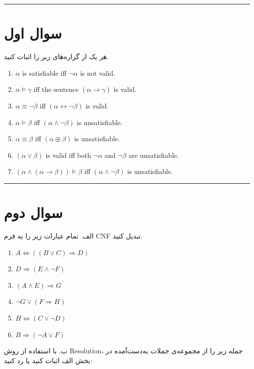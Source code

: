 \documentclass[a4paper,10pt]{article}
\begin{document}
\vspace{8pt}
\textcolor{AccentCyan}{\rule{\linewidth}{0.8pt}}
\section{\textcolor{AccentGold}{سوال اول}}
\noindent هر یک از گزاره‌های زیر را اثبات کنید.

\begin{latin}
\begin{enumerate}
	\item $\alpha$ is satisfiable iff $\neg\alpha$ is not valid.
	\item $\alpha \models \gamma$ iff the sentence $(\alpha \rightarrow \gamma)$ is valid.
	\item $\alpha \equiv \neg\beta$ iff $(\alpha \leftrightarrow \neg\beta)$ is valid.
	\item $\alpha \models \beta$ iff $(\alpha \wedge \neg\beta)$ is unsatisfiable.
	\item $\alpha \equiv \beta$ iff $(\alpha \oplus \beta)$ is unsatisfiable.
	\item $(\alpha \vee \beta)$ is valid iff both $\neg\alpha$ and $\neg\beta$ are unsatisfiable.
	\item $(\alpha \wedge (\alpha \rightarrow \beta)) \models \beta$ iff $(\alpha \wedge \neg\beta)$ is unsatisfiable.
\end{enumerate}
\end{latin}
\bigskip
\bigskip
\textcolor{AccentCyan}{\rule{\linewidth}{0.4pt}}
\section{\textcolor{AccentGold}{سوال دوم}}

\noindent الف. تمام عبارات زیر را به فرم CNF تبدیل کنید.

\begin{latin}
\begin{enumerate}
	\item $A \Leftrightarrow ((B \vee C) \Rightarrow D)$
	\item $D \Rightarrow (E \wedge \neg F)$
	\item $(A \wedge E) \Rightarrow G$
	\item $\neg G \vee (F \Rightarrow H)$
	\item $H \Leftrightarrow (C \vee \neg D)$
	\item $B \Rightarrow (\neg A \vee F)$
\end{enumerate}
\end{latin}
\noindent ب. با استفاده از روش Resolution، جمله زیر را از مجموعه‌ی جملات به‌دست‌آمده در بخش الف اثبات کنید یا رد کنید:
\end{document}
